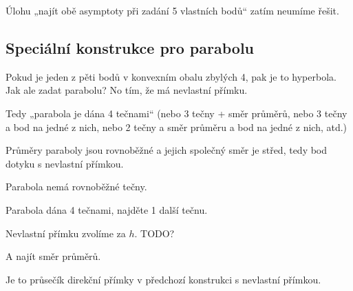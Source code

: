 \documentclass[12pt]{article}					%
\begin{document}
\begin{poznamka}
	Úlohu „najít obě asymptoty při zadání 5 vlastních bodů“ zatím neumíme řešit.
\end{poznamka}

\subsection{Speciální konstrukce pro parabolu}
\begin{poznamka}
	Pokud je jeden z pěti bodů v konvexním obalu zbylých 4, pak je to hyperbola. Jak ale zadat parabolu? No tím, že má nevlastní přímku.

	Tedy „parabola je dána 4 tečnami“ (nebo 3 tečny + směr průměrů, nebo 3 tečny a bod na jedné z nich, nebo 2 tečny a směr průměru a bod na jedné z nich, atd.)
\end{poznamka}

\begin{poznamka}[Připomenutí]
	Průměry paraboly jsou rovnoběžné a jejich společný směr je střed, tedy bod dotyku s nevlastní přímkou.

	Parabola nemá rovnoběžné tečny.
\end{poznamka}

\begin{priklad}
	Parabola dána 4 tečnami, najděte 1 další tečnu.

	\begin{reseni}
		Nevlastní přímku zvolíme za $h$. TODO?
	\end{reseni}

	A najít směr průměrů.

	\begin{reseni}
		Je to průsečík direkční přímky v předchozí konstrukci s nevlastní přímkou.
	\end{reseni}
\end{priklad}
\end{document}
